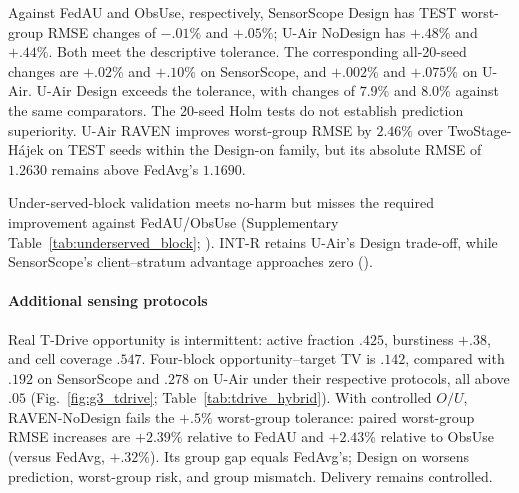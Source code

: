 \documentclass[letterpaper,journal]{IEEEtran}
\begin{document}
Against FedAU and ObsUse, respectively, SensorScope Design has TEST
worst-group RMSE changes of $-.01\%$ and $+.05\%$; U-Air NoDesign has
$+.48\%$ and $+.44\%$. Both meet the descriptive tolerance. The corresponding
all-20-seed changes are $+.02\%$ and $+.10\%$ on SensorScope, and $+.002\%$
and $+.075\%$ on U-Air. U-Air Design exceeds the tolerance, with changes of
$7.9\%$ and $8.0\%$ against the same comparators. The 20-seed Holm tests do
not establish prediction superiority. U-Air RAVEN improves worst-group RMSE
by $2.46\%$ over TwoStage-H\'ajek on TEST seeds within the Design-on family,
but its absolute RMSE of $1.2630$ remains above FedAvg's $1.1690$.


Under-served-block validation meets no-harm but misses the required improvement
against FedAU/ObsUse (Supplementary Table~\ref{tab:underserved_block};
). INT-R retains U-Air's Design trade-off,
while SensorScope's client--stratum advantage approaches zero ().
\label{subsec:eval_underserved}

\paragraph{Additional sensing protocols}
Real T-Drive opportunity is intermittent: active fraction $.425$, burstiness
$+.38$, and cell coverage $.547$.  Four-block opportunity--target TV is $.142$, compared with $.192$ on
SensorScope and $.278$ on U-Air under their respective protocols, all above $.05$
(Fig.~\ref{fig:g3_tdrive}; Table~\ref{tab:tdrive_hybrid}).
With controlled $O/U$, RAVEN-NoDesign fails the
$+.5\%$ worst-group tolerance: paired worst-group RMSE increases are $+2.39\%$ relative
to FedAU and $+2.43\%$ relative to ObsUse (versus FedAvg, $+.32\%$).  Its group gap equals FedAvg's;
Design on worsens prediction, worst-group risk, and group mismatch.  Delivery remains controlled.
\end{document}
